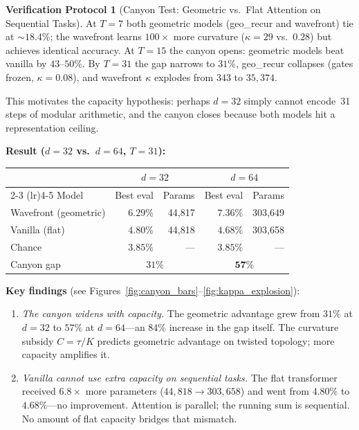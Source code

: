 \documentclass[11pt,a4paper]{article}
\theoremstyle{definition}
\newtheorem{protocol}[theorem]{Verification Protocol}
\theoremstyle{remark}
\begin{document}
\begin{protocol}[Canyon Test: Geometric vs.\ Flat Attention on 
Sequential Tasks]
At $T = 7$ both geometric models (geo\_recur and wavefront) tie 
at ${\sim}18.4\%$; the wavefront learns $100\times$ more curvature 
($\kappa = 29$ vs.\ $0.28$) but achieves identical accuracy.
At $T = 15$ the canyon opens: geometric models beat vanilla by 
$43$--$50\%$. By $T = 31$ the gap narrows to $31\%$, 
geo\_recur collapses (gates frozen, $\kappa = 0.08$), and 
wavefront $\kappa$ explodes from $343$ to $35{,}374$.

This motivates the capacity hypothesis: perhaps $d = 32$ simply 
cannot encode~31 steps of modular arithmetic, and the canyon 
closes because both models hit a representation ceiling.

\textbf{Result ($d = 32$ vs.\ $d = 64$, $T = 31$):}
\begin{center}
\begin{tabular}{lrrrr}
\toprule
 & \multicolumn{2}{c}{$d = 32$} & \multicolumn{2}{c}{$d = 64$} \\
\cmidrule(lr){2-3} \cmidrule(lr){4-5}
Model & Best eval & Params & Best eval & Params \\
\midrule
Wavefront (geometric) & $6.29\%$ & 44{,}817 & $\mathbf{7.36\%}$ & 303{,}649 \\
Vanilla (flat) & $4.80\%$ & 44{,}818 & $4.68\%$ & 303{,}658 \\
Chance & $3.85\%$ & --- & $3.85\%$ & --- \\
\midrule
Canyon gap & \multicolumn{2}{c}{$31\%$} & \multicolumn{2}{c}{$\mathbf{57\%}$} \\
\bottomrule
\end{tabular}
\end{center}

\textbf{Key findings} (see Figures~\ref{fig:canyon_bars}--\ref{fig:kappa_explosion}):
\begin{enumerate}[nosep]
  \item \emph{The canyon widens with capacity.} The geometric 
  advantage grew from $31\%$ at $d = 32$ to $57\%$ at $d = 64$---an 
  $84\%$ increase in the gap itself. The curvature subsidy 
  $C = \tau/K$ predicts geometric advantage on twisted topology; 
  more capacity amplifies it.

  \item \emph{Vanilla cannot use extra capacity on sequential 
  tasks.} The flat transformer received $6.8\times$ more 
  parameters ($44{,}818 \to 303{,}658$) and went from $4.80\%$ 
  to $4.68\%$---no improvement. Attention is parallel; the 
  running sum is sequential. No amount of flat capacity 
  bridges that mismatch.


\end{enumerate}
\end{protocol}
\end{document}

